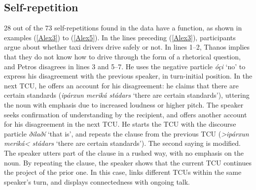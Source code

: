 \documentclass[output=paper]{LSP/langsci}
\begin{document}
\subsection{Self-repetition}
\label{Alself.repetition}
28 out of the 73 self-repetitions found in the data have a  function, as shown in examples (\ref{Alex3}) to (\ref{Alex5}).  In the lines preceding (\ref{Alex3}), participants argue about whether  taxi drivers drive safely or not. In lines 1--2, Thanos implies that they do not know how to drive through the form of a rhetorical question, and Petros disagrees in lines 3 and 5--7. He uses the negative particle \textit{óçi} `no' to express his disagreement with the previous speaker, in turn-initial position. In the next TCU, he offers an account for his disagreement: he claims that there are certain standards (\textit{ipárxun meriká stádars} `there are certain standards'), uttering the noun with emphasis due to increased loudness or higher pitch. The speaker seeks confirmation of understanding by the recipient, and offers another account for his disagreement in the next TCU. He starts the TCU with the discourse particle \textit{ðilaðí} `that is', and repeats the clause from the previous TCU (\textit{>ipárxun meriká< stádars} `there are certain standards'). The second saying is modified. The speaker utters part of the clause in a rushed way, with no emphasis on the noun. By repeating the clause, the speaker shows that the current TCU continues the project of the prior one. In this case,  links different TCUs within the same speaker’s turn, and displays connectedness with ongoing talk. 
\end{document}
